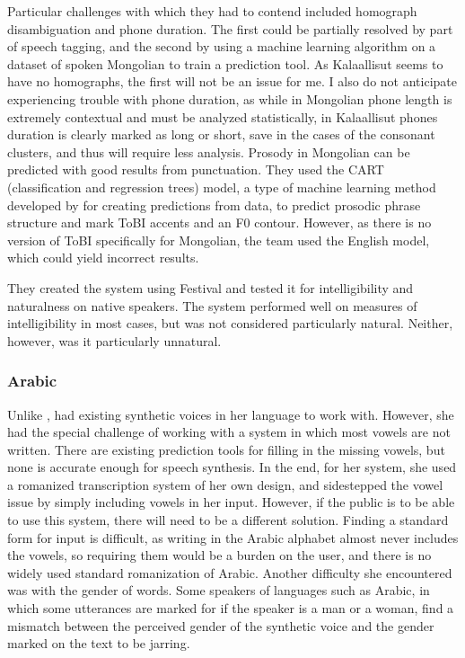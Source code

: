 \documentclass[12pt]{article}
\begin{document}
		Particular challenges with which they had to contend included homograph disambiguation and phone duration. The first could be partially resolved by part of speech tagging, and the second by using a machine learning algorithm on a dataset of spoken Mongolian to train a prediction tool. As Kalaallisut seems to have no homographs, the first will not be an issue for me. I also do not anticipate experiencing trouble with phone duration, as while in Mongolian phone length is extremely contextual and must be analyzed statistically, in Kalaallisut phones duration is clearly marked as long or short, save in the cases of the consonant clusters, and thus will require less analysis. Prosody in Mongolian can be predicted with good results from punctuation. They used the CART (classification and regression trees) model, a type of machine learning method developed by \citet{cart} for creating predictions from data, to predict prosodic phrase structure and mark ToBI accents and an F0 contour. However, as there is no version of ToBI specifically for Mongolian, the team used the English model, which could yield incorrect results.\par

		They created the system using Festival and tested it for intelligibility and naturalness on native speakers. The system performed well on measures of intelligibility in most cases, but was not considered particularly natural. Neither, however, was it particularly unnatural. \par

		\subsubsection{Arabic}
		Unlike \citet{mongolian}, \citet{Arabic-Festival} had existing synthetic voices in her language to work with. However, she had the special challenge of working with a system in which most vowels are not written. There are existing prediction tools for filling in the missing vowels, but none is accurate enough for speech synthesis. In the end, for her system, she used a romanized transcription system of her own design, and sidestepped the vowel issue by simply including vowels in her input. However, if the public is to be able to use this system, there will need to be a different solution. Finding a standard form for input is difficult, as writing in the Arabic alphabet almost never includes the vowels, so requiring them would be a burden on the user, and there is no widely used standard romanization of Arabic. Another difficulty she encountered was with the gender of words. Some speakers of languages such as Arabic, in which some utterances are marked for if the speaker is a man or a woman, find a mismatch between the perceived gender of the synthetic voice and the gender marked on the text to be jarring.
		\par
\end{document}
